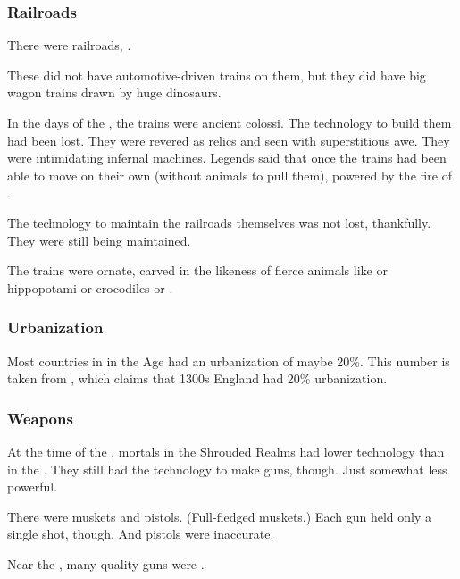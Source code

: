 \subsubsection{Railroads}
There were railroads, . 

These did not have automotive-driven trains on them, but they did have big wagon trains drawn by huge dinosaurs.

In the days of the \thirdbanewar, the trains were ancient colossi. 
The technology to build them had been lost. 
They were revered as relics and seen with superstitious awe. 
They were intimidating infernal machines. 
Legends said that once the trains had been able to move on their own (without animals to pull them), powered by the fire of \daemons. 

The technology to maintain the railroads themselves was not lost, thankfully. 
They were still being maintained. 

The trains were ornate, carved in the likeness of fierce animals like \saurians or hippopotami or crocodiles or \dragons. 





\subsubsection{Urbanization}
Most countries in \Azmith in the \Scatha Age had an urbanization of maybe 20\%. 
This number is taken from \cite{DerekKeene:FeedingMedievalEuropeanCities}, which claims that 1300s England had 20\% urbanization. 





\subsubsection{Weapons}
At the time of the \thirdbanewar, mortals in the Shrouded Realms had lower technology than in the \VaimonCaliphate. 
They still had the technology to make guns, though. 
Just somewhat less powerful. 

There were muskets and pistols. 
(Full-fledged muskets.) 
Each gun held only a single shot, though. 
And pistols were inaccurate. 

Near the \thirdbanewar, many quality guns were . 


